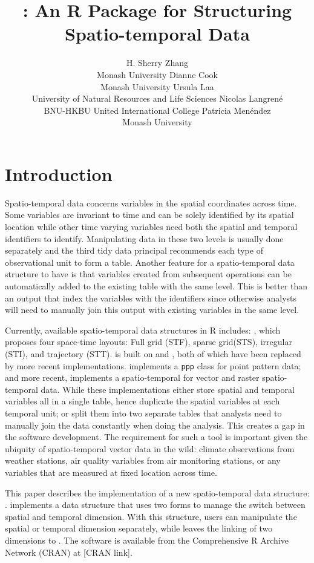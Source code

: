 \documentclass[
]{jss}
\author{
H. Sherry Zhang\\Monash University \And Dianne Cook\\Monash University
\AND Ursula Laa\\University of Natural Resources and Life Sciences
\AND Nicolas Langrené\\BNU-HKBU United International College
\AND Patricia Menéndez\\Monash University \AND
}
\title{\pkg{cubble}: An R Package for Structuring Spatio-temporal Data}
\begin{document}
\newpage

\hypertarget{introduction}{%
\section{Introduction}\label{introduction}}

Spatio-temporal data concerns variables in the spatial coordinates
across time. Some variables are invariant to time and can be solely
identified by its spatial location while other time varying variables
need both the spatial and temporal identifiers to identify. Manipulating
data in these two levels is usually done separately and the third tidy
data principal \citep{tidydata} recommends each type of observational
unit to form a table. Another feature for a spatio-temporal data
structure to have is that variables created from subsequent operations
can be automatically added to the existing table with the same level.
This is better than an output that index the variables with the
identifiers since otherwise analysts will need to manually join this
output with existing variables in the same level.

Currently, available spatio-temporal data structures in R includes:
 \citep{spacetime}, which proposes four space-time
layouts: Full grid (STF), sparse grid(STS), irregular (STI), and
trajectory (STT).  is built on  \citep{sp} and
 \citep{xts}, both of which have been replaced by more recent
implementations.  \citep{spatstat} implements a
\texttt{ppp} class for point pattern data; and more recent, 
\citep{stars} implements a spatio-temporal for vector and raster
spatio-temporal data. While these implementations either store spatial
and temporal variables all in a single table, hence duplicate the
spatial variables at each temporal unit; or split them into two separate
tables that analysts need to manually join the data constantly when
doing the analysis. This creates a gap in the software development. The
requirement for such a tool is important given the ubiquity of
spatio-temporal vector data in the wild: climate observations from
weather stations, air quality variables from air monitoring stations, or
any variables that are measured at fixed location across time.

This paper describes the implementation of a new spatio-temporal data
structure: .  implements a data structure that
uses two forms to manage the switch between spatial and temporal
dimension. With this structure, users can manipulate the spatial or
temporal dimension separately, while leaves the linking of two
dimensions to . The software is available from the
Comprehensive R Archive Network (CRAN) at {[}CRAN link{]}.
\end{document}
